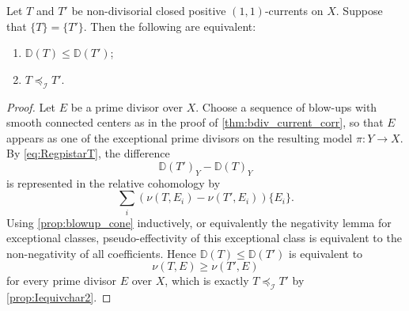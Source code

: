 \begin{corollary}\label{cor:Dorder_Iorder}
    Let $T$ and $T'$ be non-divisorial closed positive $(1,1)$-currents on $X$. Suppose that $\{T\}=\{T'\}$. Then the following are equivalent:
    \begin{enumerate}
        \item\label{itm:cor:Dorder_Iorder:1} $\mathbb{D}(T)\leq \mathbb{D}(T')$;
        \item\label{itm:cor:Dorder_Iorder:2} $T\preceq_{\mathcal{I}}T'$.
    \end{enumerate}
\end{corollary}
\begin{proof}
    Let $E$ be a prime divisor over $X$. Choose a sequence of blow-ups with smooth connected centers as in the proof of \cref{thm:bdiv_current_corr}, so that $E$ appears as one of the exceptional prime divisors on the resulting model $\pi\colon Y\rightarrow X$. By \eqref{eq:RegpistarT}, the difference
    \[
        \mathbb{D}(T')_Y-\mathbb{D}(T)_Y
    \]
    is represented in the relative cohomology by
    \[
        \sum_i\left(\nu(T,E_i)-\nu(T',E_i)\right)\{E_i\}.
    \]
    Using \cref{prop:blowup_cone} inductively, or equivalently the negativity lemma for exceptional classes, pseudo-effectivity of this exceptional class is equivalent to the non-negativity of all coefficients. Hence $\mathbb{D}(T)\leq \mathbb{D}(T')$ is equivalent to
    \[
        \nu(T,E)\geq \nu(T',E)
    \]
    for every prime divisor $E$ over $X$, which is exactly $T\preceq_{\mathcal{I}}T'$ by \cref{prop:Iequivchar2}.
\end{proof}

